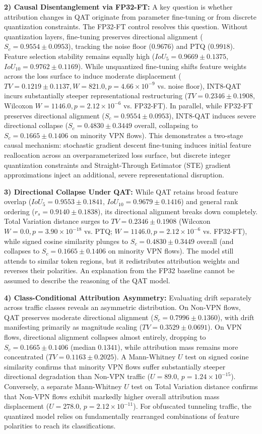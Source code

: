 \documentclass[conference]{IEEEtran}
\begin{document}
\textbf{2) Causal Disentanglement via FP32-FT:} A key question is whether attribution changes in QAT originate from parameter fine-tuning or from discrete quantization constraints. The FP32-FT control resolves this question. Without quantization layers, fine-tuning preserves directional alignment ($S_c = 0.9554 \pm 0.0953$), tracking the noise floor ($0.9676$) and PTQ ($0.9918$). Feature selection stability remains equally high ($IoU_5 = 0.9669 \pm 0.1375$, $IoU_{10} = 0.9762 \pm 0.1169$). While unquantized fine-tuning shifts feature weights across the loss surface to induce moderate displacement ($TV = 0.1219 \pm 0.1137, W = 821.0, p = 4.66 \times 10^{-9}$ vs. noise floor), INT8-QAT incurs substantially steeper representational restructuring ($TV = 0.2346 \pm 0.1908$, Wilcoxon $W = 1146.0, p = 2.12 \times 10^{-6}$ vs. FP32-FT). In parallel, while FP32-FT preserves directional alignment ($S_c = 0.9554 \pm 0.0953$), INT8-QAT induces severe directional collapse ($S_c = 0.4830 \pm 0.3449$ overall, collapsing to $S_c = 0.1665 \pm 0.1406$ on minority VPN flows). This demonstrates a two-stage causal mechanism: stochastic gradient descent fine-tuning induces initial feature reallocation across an overparameterized loss surface, but discrete integer quantization constraints and Straight-Through Estimator (STE) gradient approximations inject an additional, severe representational disruption.

\textbf{3) Directional Collapse Under QAT:} While QAT retains broad feature overlap ($IoU_5 = 0.9553 \pm 0.1841$, $IoU_{10} = 0.9679 \pm 0.1416$) and general rank ordering ($r_s = 0.9140 \pm 0.1838$), its directional alignment breaks down completely. Total Variation distance surges to $TV = 0.2346 \pm 0.1908$ (Wilcoxon $W = 0.0, p = 3.90 \times 10^{-18}$ vs. PTQ; $W = 1146.0, p = 2.12 \times 10^{-6}$ vs. FP32-FT), while signed cosine similarity plunges to $S_c = 0.4830 \pm 0.3449$ overall (and collapses to $S_c = 0.1665 \pm 0.1406$ on minority VPN flows). The model still attends to similar token regions, but it redistributes attribution weights and reverses their polarities. An explanation from the FP32 baseline cannot be assumed to describe the reasoning of the QAT model.

\textbf{4) Class-Conditional Attribution Asymmetry:} Evaluating drift separately across traffic classes reveals an asymmetric distribution. On Non-VPN flows, QAT preserves moderate directional alignment ($S_c = 0.7996 \pm 0.1360$), with drift manifesting primarily as magnitude scaling ($TV = 0.3529 \pm 0.0691$). On VPN flows, directional alignment collapses almost entirely, dropping to $S_c = 0.1665 \pm 0.1406$ (median $0.1341$), while attribution mass remains more concentrated ($TV = 0.1163 \pm 0.2025$). A Mann-Whitney $U$ test on signed cosine similarity confirms that minority VPN flows suffer substantially steeper directional degradation than Non-VPN traffic ($U = 89.0$, $p = 1.24 \times 10^{-15}$). Conversely, a separate Mann-Whitney $U$ test on Total Variation distance confirms that Non-VPN flows exhibit markedly higher overall attribution mass displacement ($U = 278.0$, $p = 2.12 \times 10^{-11}$). For obfuscated tunneling traffic, the quantized model relies on fundamentally rearranged combinations of feature polarities to reach its classifications.
\end{document}
